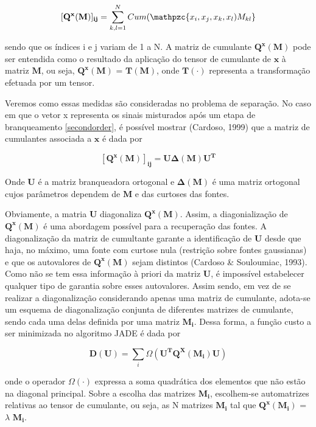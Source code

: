     \begin{equation}
        \mathbf{[Q^x(M)]_{ij}} = \sum_{k,l=1}^N Cum(\mathpzc{x_i,x_j,x_k,x_l)M_{kl}}
    \end{equation}
    
    sendo que os índices i e j variam de 1 a N. A matriz de cumulante $\mathbf{Q^x(M)}$ pode ser entendida como o resultado da aplicação do tensor de cumulante de $\mathbf{x}$ à matriz $\mathbf{M}$, ou seja, $\mathbf{Q^x(M)}$ = $\mathbf{T(M)}$, onde $\mathbf{T(\cdot)}$ representa a transformação efetuada por um tensor.
    
    Veremos como essas medidas são consideradas no problema de separação. No caso em que o vetor x representa os sinais misturados após um etapa de branqueamento \ref{secondorder}, é possível mostrar (Cardoso, 1999) que a matriz de cumulantes associada a $\mathbf{x}$ é dada por
    
    \begin{equation}
        \mathbf{[Q^x(M)]_{ij}} = \mathbf{U\Delta(M)U^T}
    \end{equation}
    
    Onde $\mathbf{U}$ é a matriz branqueadora ortogonal e  $\mathbf{\Delta(M)}$ é uma matriz ortogonal cujos parâmetros dependem de $\mathbf{M}$ e das curtoses das fontes.

    Obviamente, a matria $\mathbf{U}$ diagonaliza  $\mathbf{Q^x(M)}$. Assim, a diagonialização de $\mathbf{Q^x(M)}$ é uma abordagem possível para a recuperação das fontes.  A diagonalização da matriz de cumultante garante a identificação de $\mathbf{U}$ desde que haja, no máximo, uma fonte com curtose nula (restrição sobre fontes gaussianas) e que os autovalores de $\mathbf{Q^x(M)}$ sejam distintos (Cardoso & Souloumiac, 1993). Como não se tem essa informação à priori da matriz $\mathbf{U}$, é impossível estabelecer qualquer tipo de garantia sobre esses autovalores.
    Assim sendo, em vez de se realizar a diagonalização considerando apenas uma matriz de cumulante, adota-se um esquema de diagonalização conjunta de diferentes matrizes de cumulante, sendo cada uma delas definida por uma matriz $\mathbf{M_i}$. Dessa forma, a função custo a ser minimizada no algoritmo JADE é dada por
    
    \begin{equation}\label{eq:optimize}
        \mathbf{D(U)} = \sum_i \Omega(\mathbf{U^TQ^X(M_i)U})
    \end{equation}
    
    onde o operador $\Omega(\cdot)$ expressa a soma quadrática dos elementos que não estão na diagonal principal. Sobre a escolha das matrizes $\mathbf{M_i}$, escolhem-se automatrizes relativas ao tensor de cumulante, ou seja, as N matrizes $\mathbf{M_i}$ tal que $\mathbf{Q^x(M_i)}$ = $\lambda$ $\mathbf{M_i}$.
    
